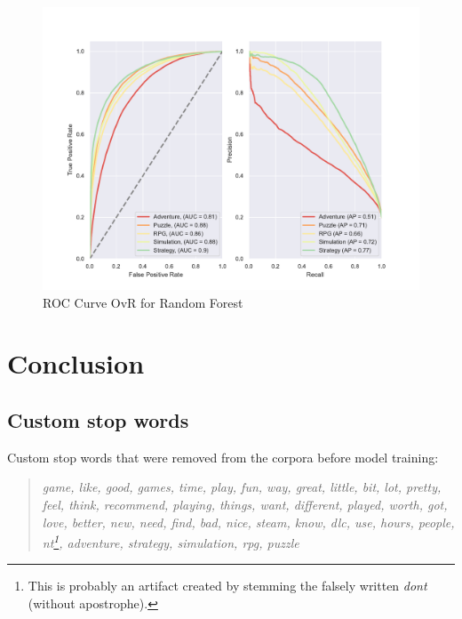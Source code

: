 \documentclass[11pt, a4paper]{article}
\newenvironment{itquote}
  {\begin{quote}\itshape}
  {\end{quote}\ignorespacesafterend}
\begin{document}
\begin{figure}
    \centering
    \includegraphics[width=\textwidth]{data/results/plots/random_forest_roc}
    \caption{ROC Curve OvR for Random Forest}
    \label{fig:rf_roc_fig}
\end{figure}



\section{Conclusion}\label{sec:conclusion}


\clearpage

\nocite{*}
\printbibliography

\clearpage

\begin{appendices}
\section{Custom stop words}\label{sec:stops}
Custom stop words that were removed from the corpora before model training:
\begin{itquote}
    game, like, good, games, time, play, fun, way, great, little, bit, lot, pretty, feel, think, recommend, playing,
    things, want, different, played, worth, got, love, better, new, need, find, bad, nice, steam, know, dlc, use, hours,
    people, nt\footnote{This is probably an artifact created by stemming the falsely written \textit{dont} (without
    apostrophe).}, adventure, strategy, simulation, rpg, puzzle
\end{itquote}
\end{appendices}
\end{document}
